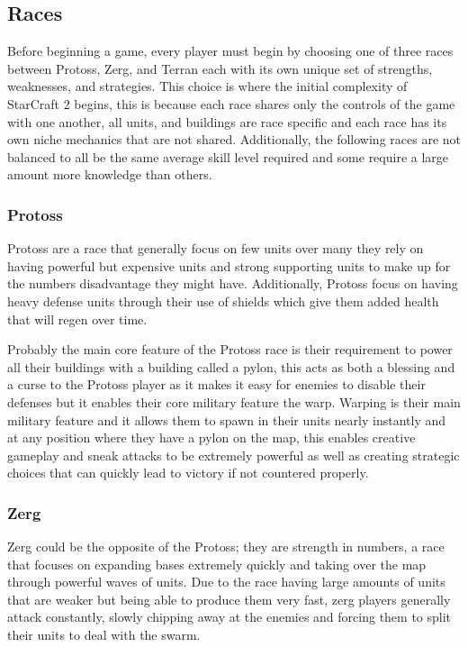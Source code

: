 \documentclass[a4paper,12pt]{report}
\begin{document}
\subsection{Races}

Before beginning a game, every player must begin by choosing one of three races between Protoss, Zerg, and Terran each with its own unique set of strengths, weaknesses, and strategies. This choice is where the initial complexity of StarCraft 2 begins, this is because each race shares only the controls of the game with one another, all units, and buildings are race specific and each race has its own niche mechanics that are not shared. Additionally, the following races are not balanced to all be the same average skill level required and some require a large amount more knowledge than others.

\subsubsection{Protoss}

Protoss are a race that generally focus on few units over many they rely on having powerful but expensive units and strong supporting units to make up for the numbers disadvantage they might have. Additionally, Protoss focus on having heavy defense units through their use of shields which give them added health that will regen over time.

Probably the main core feature of the Protoss race is their requirement to power all their buildings with a building called a pylon, this acts as both a blessing and a curse to the Protoss player as it makes it easy for enemies to disable their defenses but it enables their core military feature the warp. Warping is their main military feature and it allows them to spawn in their units nearly instantly and at any position where they have a pylon on the map, this enables creative gameplay and sneak attacks to be extremely powerful as well as creating strategic choices that can quickly lead to victory if not countered properly.

\subsubsection{Zerg}

Zerg could be the opposite of the Protoss; they are strength in numbers, a race that focuses on expanding bases extremely quickly and taking over the map through powerful waves of units. Due to the race having large amounts of units that are weaker but being able to produce them very fast, zerg players generally attack constantly, slowly chipping away at the enemies and forcing them to split their units to deal with the swarm.
\end{document}
